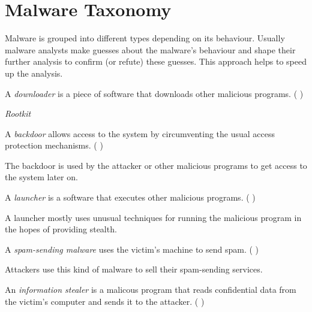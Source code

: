 \chapter{Malware Taxonomy} \label{chap:classification}

Malware is grouped into different types depending on its behaviour. Usually malware analysts make guesses about the malware's behaviour and shape their further analysis to confirm (or refute) these guesses. This approach helps to speed up the analysis. \cite[]{sikorski12}

\begin{definition}[Downloader]
A \emph{downloader} is a piece of software that downloads other malicious programs. (\cf{} \cite[]{sikorski12})
\end{definition} 

\begin{definition}[Rootkit]
\emph{Rootkit}  
\end{definition} 

\begin{definition}[Backdoor]
A \emph{backdoor} allows access to the system by circumventing the usual access protection mechanisms. (\cf{} \cite[]{sikorski12})
\end{definition} 

The backdoor is used by the attacker or other malicious programs to get access to the system later on.

\begin{definition}[Launcher]
A \emph{launcher} is a software that executes other malicious programs. (\cf{} \cite[]{sikorski12})
\end{definition} 

A launcher mostly uses unusual techniques for running the malicious program in the hopes of providing stealth.

\begin{definition}
A \emph{spam-sending malware} uses the victim's machine to send spam. (\cf{} \cite[]{sikorski12})
\end{definition}

Attackers use this kind of malware to sell their spam-sending services.

\begin{definition}
An \emph{information stealer} is a malicous program that reads confidential data from the victim's computer and sends it to the attacker. (\cf{} \cite[]{sikorski12})
\end{definition} 

